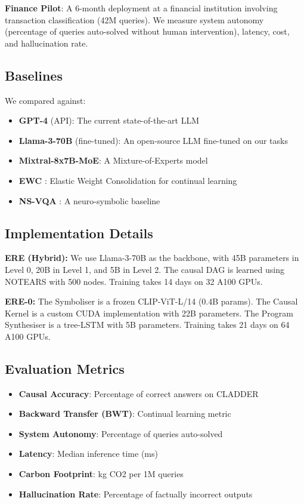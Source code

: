 \documentclass{article}
\begin{document}
\textbf{Finance Pilot}: A 6-month deployment at a financial institution involving transaction classification (42M queries). We measure system autonomy (percentage of queries auto-solved without human intervention), latency, cost, and hallucination rate.

\subsection{Baselines}

We compared against:
\begin{itemize}
    \item \textbf{GPT-4} (API): The current state-of-the-art LLM
    \item \textbf{Llama-3-70B} (fine-tuned): An open-source LLM fine-tuned on our tasks
    \item \textbf{Mixtral-8x7B-MoE}: A Mixture-of-Experts model
    \item \textbf{EWC} : Elastic Weight Consolidation for continual learning
    \item \textbf{NS-VQA} : A neuro-symbolic baseline
\end{itemize}

\subsection{Implementation Details}

\textbf{ERE (Hybrid):} We use Llama-3-70B as the backbone, with 45B parameters in Level 0, 20B in Level 1, and 5B in Level 2. The causal DAG is learned using NOTEARS  with 500 nodes. Training takes 14 days on 32 A100 GPUs.

\textbf{ERE-0:} The Symboliser is a frozen CLIP-ViT-L/14 (0.4B params). The Causal Kernel is a custom CUDA implementation with 22B parameters. The Program Synthesiser is a tree-LSTM with 5B parameters. Training takes 21 days on 64 A100 GPUs.

\subsection{Evaluation Metrics}

\begin{itemize}
    \item \textbf{Causal Accuracy}: Percentage of correct answers on CLADDER
    \item \textbf{Backward Transfer (BWT)}: Continual learning metric
    \item \textbf{System Autonomy}: Percentage of queries auto-solved
    \item \textbf{Latency}: Median inference time (ms)
    \item \textbf{Carbon Footprint}: kg CO2 per 1M queries
    \item \textbf{Hallucination Rate}: Percentage of factually incorrect outputs
\end{itemize}
\end{document}
